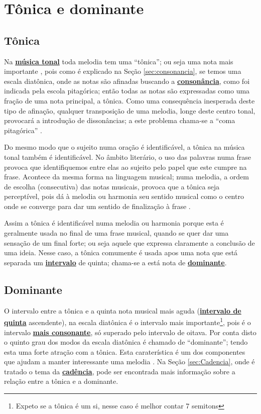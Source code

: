 \section{Tônica e dominante}


\subsection{Tônica}
\label{sec:Tonica}
Na \hyperref[sec:MusicaTonal]{\textbf{música tonal}} toda melodia tem uma ``tônica''; 
ou seja uma nota mais importante \cite[pp. 19]{holst1998abc}, 
pois como é explicado na Seção \ref{sec:consonancia}, se temos uma escala diatônica,
onde as notas são afinadas buscando a \hyperref[ref:consonancia]{\textbf{consonância}},
como foi indicada pela escola pitagórica; então todas as notas são expressadas
como uma fração de uma nota principal, a tônica. 
Como uma consequência inesperada deste tipo de afinação, 
qualquer transposição de uma melodia, longe deste centro tonal, 
provocará a introdução de dissonâncias;
a este problema chama-se a ``coma pitagórica'' \cite[pp. 24]{arbones2012armonia}.
 

Do mesmo modo que o sujeito numa oração é identificável, a tônica na música tonal também é identificável.
No âmbito literário, o uso das palavras numa frase 
provoca que identifiquemos entre elas ao sujeito pelo papel que este cumpre na frase.
Acontece da mesma forma na linguagem musical; numa melodia,
a ordem de escolha (consecutiva) das notas musicais, 
provoca que a tônica seja perceptível, pois dá à melodia ou harmonia 
seu sentido musical como o centro onde se converge para dar um sentido de finalização à frase \cite[pp. 19]{holst1998abc}.

Assim a tônica é identificável numa melodia ou harmonia 
porque esta é geralmente usada no final de uma frase musical, 
quando se quer dar uma sensação de um final forte;
ou seja aquele que expressa claramente a conclusão de uma ideia.
Nesse caso, a tônica comumente é usada apos uma nota que está separada um 
\hyperref[sec:intervalomelodico]{\textbf{intervalo}} de quinta;
chama-se a está nota de \hyperref[sec:dominante]{\textbf{dominante}}.

\subsection{Dominante}
\label{sec:dominante}

O intervalo entre a tônica e a quinta nota musical mais aguda 
(\hyperref[fig:abc-iquinta2]{\textbf{intervalo de quinta}} ascendente), 
na escala diatônica 
é o intervalo mais importante\footnote{Expeto se a tônica é um si, nesse caso é melhor contar 7 semitons},
pois é o intervalo \hyperref[tab:pitagorascromatica2]{\textbf{mais consonante}}, 
só superado pelo intervalo de oitava. 
Por conta disto o quinto grau dos modos da escala diatônica é chamado  de ``dominante'';
tendo esta uma forte atração com a tônica. 
Esta caraterística é um dos componentes que ajudam a manter interessante  uma melodia \cite[pp. 24]{holst1998abc}.
Na Seção \ref{sec:Cadencia}, onde é tratado o tema da \hyperref[sec:Cadencia]{\textbf{cadência}},
pode ser encontrada mais informação sobre a relação entre a tônica e a dominante.

